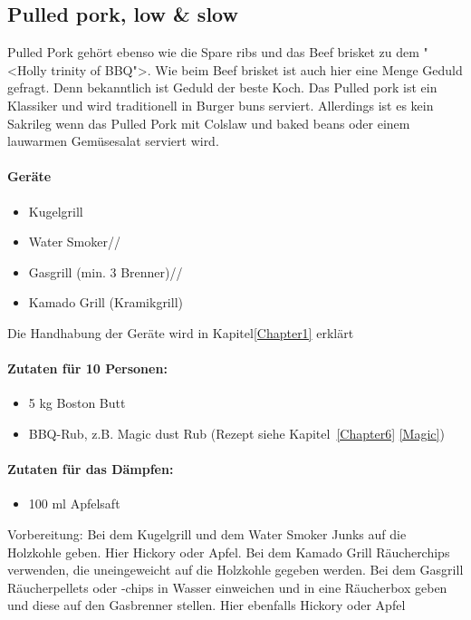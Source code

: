 \subsection{Pulled pork, low \& slow}
Pulled Pork gehört ebenso wie die Spare ribs und das Beef brisket zu 
dem "<Holly trinity of BBQ">. Wie beim Beef brisket ist auch hier eine
Menge Geduld gefragt. Denn bekanntlich ist Geduld der beste Koch. Das 
Pulled pork ist ein Klassiker und wird traditionell in Burger buns serviert. Allerdings ist 
es kein Sakrileg wenn das Pulled Pork mit Colslaw und baked beans oder 
einem lauwarmen Gemüsesalat serviert wird.

\paragraph{Geräte}

\begin{itemize}[noitemsep]
	\item Kugelgrill
	\item Water Smoker//
 	\item Gasgrill (min. 3 Brenner)//
	\item Kamado Grill (Kramikgrill)
\end{itemize}

Die Handhabung der Geräte wird in Kapitel\ref{Chapter1} erklärt

\paragraph{Zutaten für 10 Personen:}

\begin{itemize}[noitemsep]
	\item 5 kg Boston Butt
	\item BBQ-Rub, z.B. Magic dust Rub (Rezept siehe 
	Kapitel~\ref{Chapter6} \vref{Magic})
\end{itemize}

\paragraph{Zutaten für das Dämpfen:}

\begin{itemize}[noitemsep]
	\item 100 ml Apfelsaft
\end{itemize}

Vorbereitung: Bei dem Kugelgrill und dem Water Smoker Junks auf die Holzkohle geben. Hier 
Hickory oder Apfel.
Bei dem Kamado Grill Räucherchips verwenden, die uneingeweicht auf die Holzkohle gegeben 
werden.
Bei dem Gasgrill Räucherpellets oder -chips in Wasser einweichen und in 
eine Räucherbox geben und diese auf den Gasbrenner stellen. Hier 
ebenfalls Hickory oder Apfel

